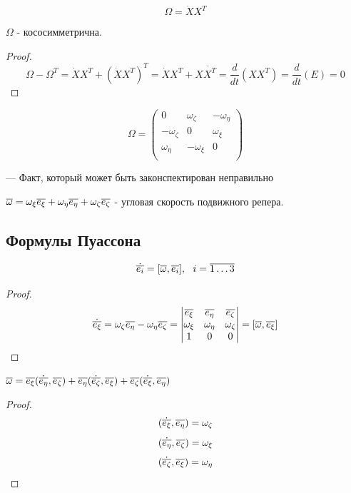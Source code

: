   $$ \Omega = \dot X X^T $$

  
  \begin{ass}
  $\Omega$ - кососимметрична.
  \end{ass}
  \begin{proof}
  $$ \Omega - \Omega^T = \dot X X^T + (\dot X X^T)^T = \dot X X^T + X \dot {X^T} = \frac{d}{dt}(XX^T) = 
  \frac{d}{dt}(E) = 0 $$
  \end{proof}
  
  \begin{cor}
  $$ \Omega =
  \left(
  \begin{matrix}
  0 & \omega_{\zeta} & -\omega_{\eta} \\
  -\omega_{\zeta} & 0 & \omega_{\xi} \\
  \omega_{\eta} & -\omega_{\xi} & 0 \\
  \end{matrix}
  \right)
  $$
  \end{cor}
  --- Факт, который может быть законспектирован неправильно
  \begin{df}
  $ {\overline{\omega}} = \omega_{\xi}{\overline{e_{\xi}}} + \omega_{\eta}{\overline{e_{\eta}}} + \omega_{\zeta}{\overline{e_{\zeta}}} $ - угловая скорость подвижного репера.
  \end{df}
  
  \subsection{Формулы Пуассона}
  \begin{ass}
  $$ \dot{{\overline{e_i}}} = [{\overline{\omega}}, {\overline{e_i}}],~~ i = \overline{1 \ldots 3} $$
  \end{ass}
  \begin{proof}
  $$
  \dot{{\overline{e_{\xi}}}} = \omega_{\zeta} {\overline{e_{\eta}}} - \omega_{\eta} {\overline{e_{\zeta}}} =
  \begin{vmatrix}
  {\overline{e_{\xi}}} & {\overline{e_{\eta}}} & {\overline{e_{\zeta}}} \\
  \omega_{\xi} & \omega_{\eta} & \omega_{\zeta} \\
  1 & 0 & 0 \\ 
  \end{vmatrix}
  =
  [{\overline{\omega}}, {\overline{e_{\xi}}}] 
  $$
  \end{proof}
  
  \begin{ass}
  $ {\overline{\omega}} = {\overline{e_{\xi}}}(\dot{{\overline{e_{\eta}}}}, {\overline{e_{\zeta}}}) + {\overline{e_{\eta}}}(\dot{{\overline{e_{\zeta}}}}, {\overline{e_{\xi}}}) + {\overline{e_{\zeta}}}(\dot{{\overline{e_{\xi}}}}, {\overline{e_{\eta}}}) $
  \end{ass}
  \begin{proof}
  $$ (\dot{{\overline{e_{\xi}}}}, {\overline{e_{\eta}}}) = \omega_{\zeta} $$
  $$ (\dot{{\overline{e_{\eta}}}}, {\overline{e_{\zeta}}}) = \omega_{\xi} $$
  $$ (\dot{{\overline{e_{\zeta}}}}, {\overline{e_{\xi}}}) = \omega_{\eta} $$
  \end{proof}
  

